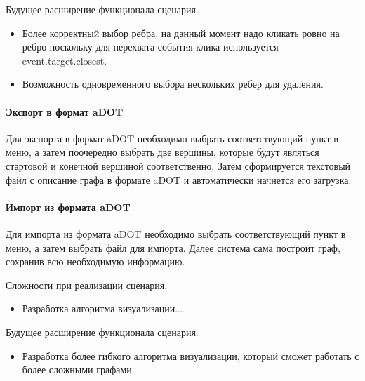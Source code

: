 Будущее расширение функционала сценария.
\begin{itemize}
	\item Более корректный выбор ребра, на данный момент надо кликать ровно на ребро поскольку для перехвата события клика используется event.target.closest.
	\item Возможность одновременного выбора нескольких ребер для удаления.
\end{itemize}

\paragraph{Экспорт в формат aDOT}

Для экспорта в формат aDOT необходимо выбрать соответствующий пункт в меню, а затем поочередно выбрать две вершины, которые будут являться стартовой и конечной вершиной соответственно. Затем сформируется текстовый файл с описание графа в формате aDOT и автоматически начнется его загрузка.

\paragraph{Импорт из формата aDOT}

Для импорта из формата aDOT необходимо выбрать соответствующий пункт в меню, а затем выбрать файл для импорта. Далее система сама построит граф, сохранив всю необходимую информацию.

Сложности при реализации сценария.
\begin{itemize}
	\item Разработка алгоритма визуализации...
\end{itemize}

Будущее расширение функционала сценария.
\begin{itemize}
	\item Разработка более гибкого алгоритма визуализации, который сможет работать с более сложными графами.
\end{itemize}



\noteattributes{}













